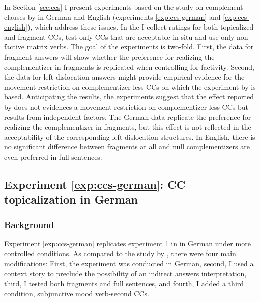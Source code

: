 In Section \ref{sec:ccs} I present experiments based on the study on complement clauses by \citet{merchant.etal2013} in German and English (experiments \ref{exp:ccs-german} and \ref{exp:ccs-english}), which address these issues. In the I collect ratings for both topicalized and fragment CCs, test only CCs that are acceptable in situ and use only non-factive matrix verbs. The goal of the experiments is two-fold. First, the data for fragment answers will show whether the preference for realizing the complementizer in fragments is replicated when controlling for factivity. Second, the data for left dislocation answers might provide empirical evidence for the movement restriction on complementizer-less CCs on which the experiment by \citet{merchant.etal2013} is based. Anticipating the results, the experiments suggest that the effect reported by \citet{merchant.etal2013} does not evidences a movement restriction on complementizer-less CCs but results from independent factors. The German data replicate the preference for realizing the complementizer in fragments, but this effect is not reflected in the acceptability of the corresponding left dislocation structures. In English, there is no significant difference between fragments at all and null complementizers are even preferred in full sentences.

\label{exp:ccs-german}
\subsection{Experiment \ref{exp:ccs-german}: CC topicalization in German}\label{sec:ccs-german}
\largerpage[1.75]

\subsubsection{Background}\label{sec:ccs-german-background}
Experiment \ref{exp:ccs-german} replicates experiment 1 in \citet{merchant.etal2013} in German under more controlled conditions. As compared to the study by \citet{merchant.etal2013}, there were four main modifications: First, the experiment was conducted in German, second, I used a context story to preclude the possibility of an indirect answers interpretation, third, I tested both fragments and full sentences, and fourth, I added a third condition, subjunctive mood verb-second CCs.

